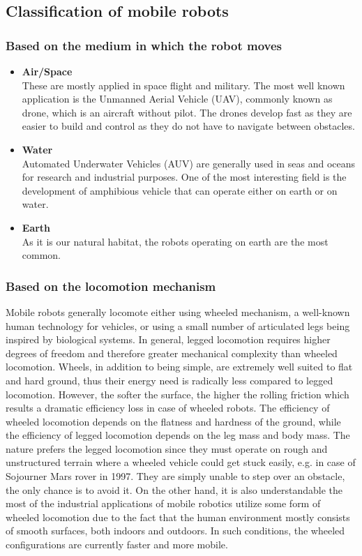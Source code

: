 \documentclass[12pt,english]{article}
\begin{document}
\subsection{Classification of mobile robots {\normalsize \cite{sieg}\cite{rirt}}}
\subsubsection{Based on the medium in which the robot moves}
\begin{itemize}
	\item \textbf{Air/Space} \\
		These are mostly applied in space flight and military. The most well known application is the Unmanned Aerial Vehicle (UAV), commonly known as drone, which is an aircraft without pilot. The drones develop fast as they are easier to build and control as they do not have to navigate between obstacles.
	\item \textbf{Water} \\
		Automated Underwater Vehicles (AUV) are generally used in seas and oceans for research and industrial purposes. One of the most interesting field is the development of amphibious vehicle that can operate either on earth or on water.
	\item \textbf{Earth} \\
		As it is our natural habitat, the robots operating on earth are the most common.	
\end{itemize}
\subsubsection{Based on the locomotion mechanism}
Mobile robots generally locomote either using wheeled mechanism, a well-known human technology for vehicles, or using a small number of articulated legs being inspired by biological systems. In general, legged locomotion requires higher degrees of freedom and therefore greater mechanical complexity than wheeled locomotion. Wheels, in addition to being simple, are extremely well suited to flat and hard ground, thus their energy need is radically less compared to legged locomotion. However, the softer the surface, the higher the rolling friction which results a dramatic efficiency loss in case of wheeled robots. The efficiency of wheeled locomotion depends on the flatness and hardness of the ground, while the efficiency of legged locomotion depends on the leg mass and body mass. The nature prefers the legged locomotion since they must operate on rough and unstructured terrain where a wheeled vehicle could get stuck easily, e.g. in case of Sojourner Mars rover in 1997. They are simply unable to step over an obstacle, the only chance is to avoid it.
On the other hand, it is also understandable the most of the industrial applications of mobile robotics utilize some form of wheeled locomotion due to the fact that the human environment mostly consists of smooth surfaces, both indoors and outdoors. In such conditions, the wheeled configurations are currently faster and more mobile.
\end{document}
